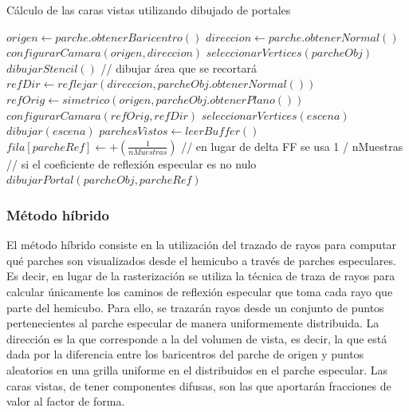 \begin{algorithm}
	\caption{Cálculo de las caras vistas utilizando dibujado de portales}
	\label{alg:9}
		\fontsize{8}{8}\selectfont
	\begin{algorithmic}
		\State $origen \gets parche.obtenerBaricentro()$
		\State $direccion \gets parche.obtenerNormal()$
		\State $configurarCamara(origen, direccion)$
		\State $seleccionarVertices(parcheObj)$
		\State $dibujarStencil()$ // dibujar área que se recortará
		\State $refDir \gets reflejar(direccion, parcheObj.obtenerNormal())$
		\State $refOrig \gets simetrico(origen, parcheObj.obtenerPlano())$
		\State $configurarCamara(refOrig, refDir)$
		\State $seleccionarVertices(escena)$
		\State $dibujar(escena)$
		\State $parchesVistos \gets leerBuffer()$
		\State $fila[parcheRef] \gets +(\frac{1}{nMuestras})$ // en lugar de delta FF se usa 1 / nMuestras
		 // si el coeficiente de reflexión especular es no nulo
		\State $dibujarPortal(parcheObj, parcheRef)$
		\EndIf
		\EndIf
		\EndLoop
		\EndFunction
	\end{algorithmic}
\end{algorithm}
\subsubsection{Método híbrido}

El método híbrido consiste en la utilización del trazado de rayos para computar qué parches son visualizados desde el hemicubo a través de parches especulares. Es decir, en lugar de la rasterización se utiliza la técnica de traza de rayos para calcular únicamente los caminos de reflexión especular que toma cada rayo que parte del hemicubo. Para ello, se trazarán rayos desde un conjunto de puntos pertenecientes al parche especular de manera uniformemente distribuida. La dirección es la que corresponde a la del volumen de vista, es decir, la que está dada por la diferencia entre los baricentros del parche de origen y puntos aleatorios en una grilla uniforme en el distribuidos en el parche especular. Las caras vistas, de tener componentes difusas, son las que aportarán fracciones de valor al factor de forma.

